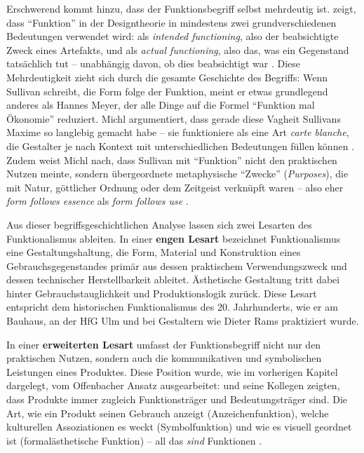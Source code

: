 \documentclass[
    a4paper,
    11pt,
    bibliography=totoc,
    listof=totoc,
    parskip=half,
    headings=normal
]{scrbook}
\begin{document}
Erschwerend kommt hinzu, dass der Funktionsbegriff selbst mehrdeutig ist. \citeauthor{michlFormFollowsWhat1995} zeigt, dass \enquote{Funktion} in der Designtheorie in mindestens zwei grundverschiedenen Bedeutungen verwendet wird: als \textit{intended functioning}, also der beabsichtigte Zweck eines Artefakts, und als \textit{actual functioning}, also das, was ein Gegenstand tatsächlich tut -- unabhängig davon, ob dies beabsichtigt war \autocite{michlFormFollowsWhat1995}. Diese Mehrdeutigkeit zieht sich durch die gesamte Geschichte des Begriffs: Wenn Sullivan schreibt, die Form folge der Funktion, meint er etwas grundlegend anderes als Hannes Meyer, der alle Dinge auf die Formel \enquote{Funktion mal Ökonomie} reduziert. Michl argumentiert, dass gerade diese Vagheit Sullivans Maxime so langlebig gemacht habe -- sie funktioniere als eine Art \textit{carte blanche}, die Gestalter je nach Kontext mit unterschiedlichen Bedeutungen füllen können \autocite{michlFormFollowsWhat1995}. Zudem weist Michl nach, dass Sullivan mit \enquote{Funktion} nicht den praktischen Nutzen meinte, sondern übergeordnete metaphysische \enquote{Zwecke} (\textit{Purposes}), die mit Natur, göttlicher Ordnung oder dem Zeitgeist verknüpft waren -- also eher \textit{form follows essence} als \textit{form follows use} \autocite{michlFormFollowsWhat1995}.

Aus dieser begriffsgeschichtlichen Analyse lassen sich zwei Lesarten des Funktionalismus ableiten. In einer \textbf{engen Lesart} bezeichnet Funktionalismus eine Gestaltungshaltung, die Form, Material und Konstruktion eines Gebrauchsgegenstandes primär aus dessen praktischem Verwendungszweck und dessen technischer Herstellbarkeit ableitet. Ästhetische Gestaltung tritt dabei hinter Gebrauchstauglichkeit und Produktionslogik zurück. Diese Lesart entspricht dem historischen Funktionalismus des 20. Jahrhunderts, wie er am Bauhaus, an der HfG Ulm und bei Gestaltern wie Dieter Rams praktiziert wurde.

In einer \textbf{erweiterten Lesart} umfasst der Funktionsbegriff nicht nur den praktischen Nutzen, sondern auch die kommunikativen und symbolischen Leistungen eines Produktes. Diese Position wurde, wie im vorherigen Kapitel dargelegt, vom Offenbacher Ansatz ausgearbeitet: \citeauthor{grosGrundlagenEinerTheorie2021} und seine Kollegen zeigten, dass Produkte immer zugleich Funktionsträger und Bedeutungsträger sind. Die Art, wie ein Produkt seinen Gebrauch anzeigt (Anzeichenfunktion), welche kulturellen Assoziationen es weckt (Symbolfunktion) und wie es visuell geordnet ist (formalästhetische Funktion) -- all das \textit{sind} Funktionen \autocite[88\psqq]{grosGrundlagenEinerTheorie2021}.
\end{document}
